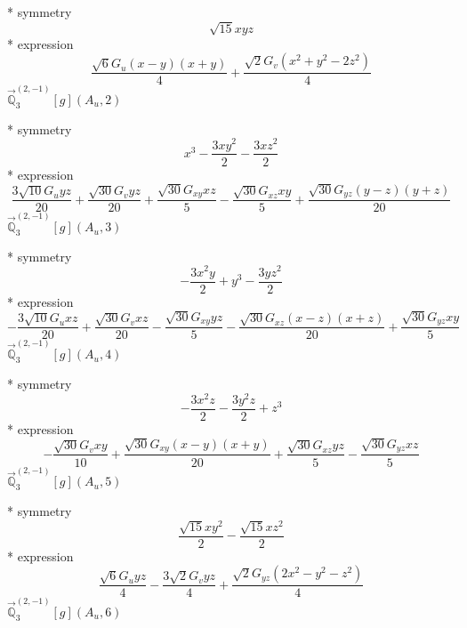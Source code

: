 \documentclass[fleqn,8pt]{jsarticle}
\begin{document}
\noindent\quad ** symmetry
\begin{dmath*}
\sqrt{15} x y z
\end{dmath*}
\noindent\quad ** expression
\begin{dmath*}
\frac{\sqrt{6} G_{u} \left(x - y\right) \left(x + y\right)}{4} + \frac{\sqrt{2} G_{v} \left(x^{2} + y^{2} - 2 z^{2}\right)}{4}
\end{dmath*}
\noindent\quad $\vec{\mathbb{Q}}_{3}^{(2,-1)}[g](A_{u},2)$

\noindent\quad ** symmetry
\begin{dmath*}
x^{3} - \frac{3 x y^{2}}{2} - \frac{3 x z^{2}}{2}
\end{dmath*}
\noindent\quad ** expression
\begin{dmath*}
\frac{3 \sqrt{10} G_{u} y z}{20} + \frac{\sqrt{30} G_{v} y z}{20} + \frac{\sqrt{30} G_{xy} x z}{5} - \frac{\sqrt{30} G_{xz} x y}{5} + \frac{\sqrt{30} G_{yz} \left(y - z\right) \left(y + z\right)}{20}
\end{dmath*}
\noindent\quad $\vec{\mathbb{Q}}_{3}^{(2,-1)}[g](A_{u},3)$

\noindent\quad ** symmetry
\begin{dmath*}
- \frac{3 x^{2} y}{2} + y^{3} - \frac{3 y z^{2}}{2}
\end{dmath*}
\noindent\quad ** expression
\begin{dmath*}
- \frac{3 \sqrt{10} G_{u} x z}{20} + \frac{\sqrt{30} G_{v} x z}{20} - \frac{\sqrt{30} G_{xy} y z}{5} - \frac{\sqrt{30} G_{xz} \left(x - z\right) \left(x + z\right)}{20} + \frac{\sqrt{30} G_{yz} x y}{5}
\end{dmath*}
\noindent\quad $\vec{\mathbb{Q}}_{3}^{(2,-1)}[g](A_{u},4)$

\noindent\quad ** symmetry
\begin{dmath*}
- \frac{3 x^{2} z}{2} - \frac{3 y^{2} z}{2} + z^{3}
\end{dmath*}
\noindent\quad ** expression
\begin{dmath*}
- \frac{\sqrt{30} G_{v} x y}{10} + \frac{\sqrt{30} G_{xy} \left(x - y\right) \left(x + y\right)}{20} + \frac{\sqrt{30} G_{xz} y z}{5} - \frac{\sqrt{30} G_{yz} x z}{5}
\end{dmath*}
\noindent\quad $\vec{\mathbb{Q}}_{3}^{(2,-1)}[g](A_{u},5)$

\noindent\quad ** symmetry
\begin{dmath*}
\frac{\sqrt{15} x y^{2}}{2} - \frac{\sqrt{15} x z^{2}}{2}
\end{dmath*}
\noindent\quad ** expression
\begin{dmath*}
\frac{\sqrt{6} G_{u} y z}{4} - \frac{3 \sqrt{2} G_{v} y z}{4} + \frac{\sqrt{2} G_{yz} \left(2 x^{2} - y^{2} - z^{2}\right)}{4}
\end{dmath*}
\noindent\quad $\vec{\mathbb{Q}}_{3}^{(2,-1)}[g](A_{u},6)$
\end{document}
